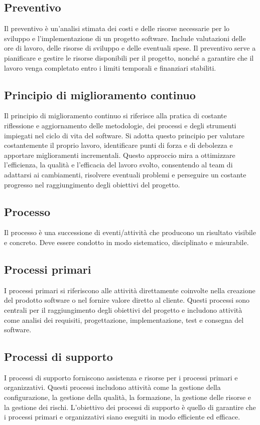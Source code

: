 \subsection{Preventivo} 
Il preventivo è un'analisi stimata dei costi e delle risorse necessarie per lo sviluppo e l'implementazione di un progetto software. Include valutazioni delle ore di lavoro, delle risorse di sviluppo e delle eventuali spese. Il preventivo serve a pianificare e gestire le risorse disponibili per il progetto, nonché a garantire che il lavoro venga completato entro i limiti temporali e finanziari stabiliti. 
\subsection{Principio di miglioramento continuo} 
Il principio di miglioramento continuo si riferisce alla pratica di costante riflessione e aggiornamento delle metodologie, dei processi e degli strumenti impiegati nel ciclo di vita del software. Si adotta questo principio per valutare costantemente il proprio lavoro, identificare punti di forza e di debolezza e apportare miglioramenti incrementali. Questo approccio mira a ottimizzare l'efficienza, la qualità e l'efficacia del lavoro svolto, consentendo al team di adattarsi ai cambiamenti, risolvere eventuali problemi e perseguire un costante progresso nel raggiungimento degli obiettivi del progetto. 
\subsection{Processo} 
Il processo è una successione di eventi/attività che producono un risultato visibile e concreto. Deve essere condotto in modo sistematico, disciplinato e misurabile.
\subsection{Processi primari} 
I processi primari si riferiscono alle attività direttamente coinvolte nella creazione del prodotto software o nel fornire valore diretto al cliente. Questi processi sono centrali per il raggiungimento degli obiettivi del progetto e includono attività come analisi dei requisiti, progettazione, implementazione, test e consegna del software.
\subsection{Processi di supporto} 
I processi di supporto forniscono assistenza e risorse per i processi primari e organizzativi. Questi processi includono attività come la gestione della configurazione, la gestione della qualità, la formazione, la gestione delle risorse e la gestione dei rischi. L'obiettivo dei processi di supporto è quello di garantire che i processi primari e organizzativi siano eseguiti in modo efficiente ed efficace.
